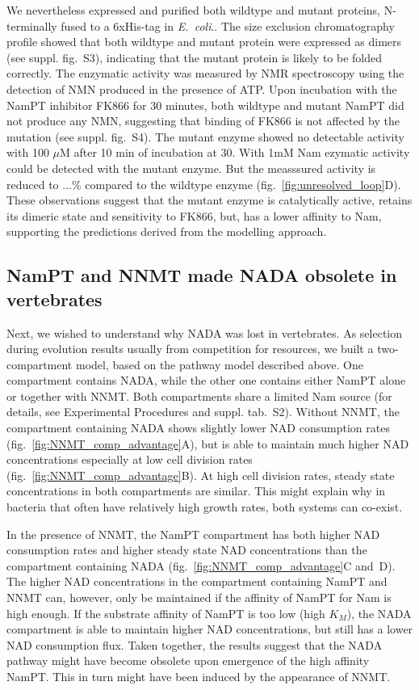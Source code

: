 We nevertheless expressed and purified  both wildtype and mutant proteins, N-terminally fused to a 6xHis-tag in \textit{E.~coli}.. The size exclusion chromatography profile showed that both wildtype and mutant protein were expressed as dimers (see suppl. fig.~S3), indicating that the  mutant protein is likely to be folded correctly. The enzymatic activity was measured by NMR spectroscopy using the detection of NMN produced in the presence of ATP. Upon incubation with the NamPT inhibitor FK866 \cite{Hasmann2003} for 30 minutes, both wildtype and mutant NamPT did not produce any NMN, suggesting that binding of FK866 is not affected by the mutation (see suppl. fig.~S4). The mutant enzyme showed no detectable activity with 100 $\mu$M  after 10 min of incubation at 30. With 1mM Nam ezymatic activity could be detected with the mutant enzyme. But the measssured activity is reduced to ...\% compared to the wildtype enzyme (fig.~\ref{fig:unresolved_loop}D). These observations suggest that the mutant enzyme is catalytically active, retains its dimeric state and sensitivity to FK866, but, has a  lower affinity to Nam, supporting the predictions derived from the modelling approach. 




\subsection{NamPT and NNMT made NADA obsolete in vertebrates}

Next, we wished to understand why NADA was lost in vertebrates. As selection during evolution results usually from competition for resources, we built a two-compartment model, based on the pathway model described above. One compartment contains NADA, while the other one contains either NamPT alone or together with NNMT. Both compartments share a limited Nam source (for details, see Experimental Procedures and suppl. tab.~S2). Without NNMT, the compartment containing NADA shows slightly lower NAD consumption rates (fig.~\ref{fig:NNMT_comp_advantage}A), but is able to maintain much higher NAD concentrations especially at low cell division rates (fig.~\ref{fig:NNMT_comp_advantage}B). At high cell division rates, steady state concentrations in both compartments are similar. This might explain why in bacteria that often have relatively high growth rates, both systems can co-exist.

In the presence of NNMT, the NamPT compartment has both higher NAD consumption rates and higher steady state NAD concentrations than the compartment containing NADA (fig.~\ref{fig:NNMT_comp_advantage}C and~D). The higher NAD concentrations in the compartment containing NamPT and NNMT can, however, only be maintained if the affinity of NamPT for Nam is high enough. If the substrate affinity of NamPT is too low (high $K_{M}$), the NADA compartment is able to maintain higher NAD concentrations, but still has a lower NAD consumption flux. Taken together, the results suggest that the NADA pathway might have become obsolete upon emergence of the high affinity NamPT. This in turn might have been induced by the appearance of NNMT.

